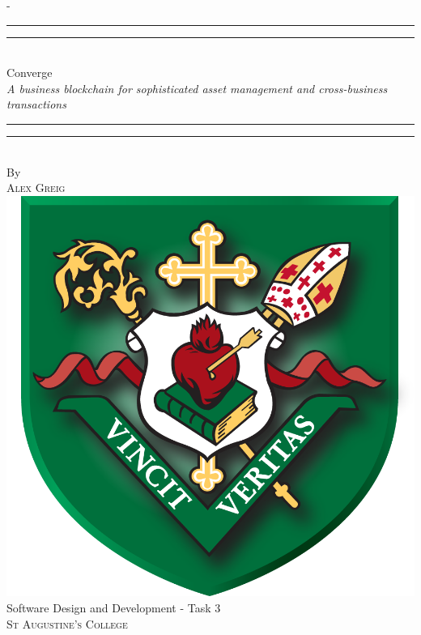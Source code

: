 \begin{titlingpage}
\begin{SingleSpace}
\calccentering{\unitlength} 
\begin{adjustwidth*}{\unitlength}{-\unitlength}
\vspace*{13mm}
\begin{center}
\rule[0.5ex]{\linewidth}{2pt}\vspace*{-\baselineskip}\vspace*{3.2pt}
\rule[0.5ex]{\linewidth}{1pt}\\[\baselineskip]
{\HUGE Converge}\\[4mm]
{\Large \textit{A business blockchain for sophisticated asset management and cross-business transactions}}\\
\rule[0.5ex]{\linewidth}{1pt}\vspace*{-\baselineskip}\vspace{3.2pt}
\rule[0.5ex]{\linewidth}{2pt}\\
\vspace{6.5mm}
{\large By}\\
\vspace{6.5mm}
{\large\textsc{Alex Greig}}\\
\vspace{10mm}
\includegraphics[scale=0.15]{logos/sta.png}
\\
\vspace{10mm}
{\large Software Design and Development - Task 3\\
\textsc{St Augustine's College}} \\


\end{center}
\end{adjustwidth*}
\end{SingleSpace}
\end{titlingpage}
